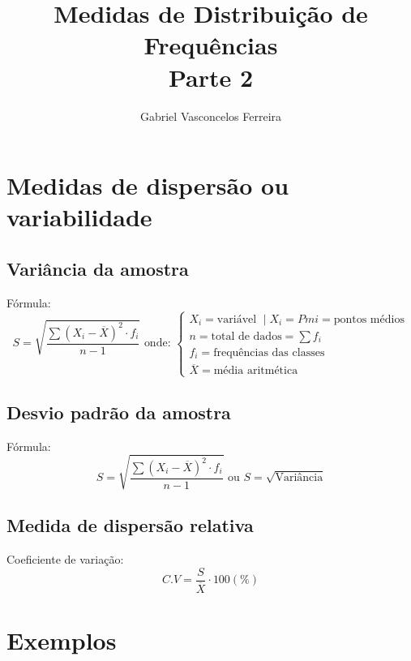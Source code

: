 \documentclass{jhwhw}
\begin{document}
\author{Gabriel Vasconcelos Ferreira}
\title{%
	\large Medidas de Distribuição de Frequências \\
	Parte 2 \\
}
\maketitle
\chapter{Medidas de dispersão ou variabilidade}
\section{Variância da amostra}
Fórmula:
\[
	\boxed{S = \sqrt{\frac{\sum{(X_i-\overline{X})^2\cdot f_i}}{n-1}}} \text{ onde: } \begin{cases}
		X_i = \text{variável } \mid X_i = Pmi = \text{pontos médios} \\
		n = \text{total de dados} = \sum{f_i}                        \\
		f_i = \text{frequências das classes}                         \\
		\overline{X} = \text{média aritmética}
	\end{cases}
\]
\section{Desvio padrão da amostra}
Fórmula:
\[
	\boxed{S = \sqrt{\frac{\sum{(X_i-\overline{X})^2\cdot f_i}}{n-1}}} \text{ ou } \boxed{S = \sqrt{\text{Variância}}}
\]
\section{Medida de dispersão relativa}
Coeficiente de variação:
\[
	C.V = \frac{S}{\overline{X}} \cdot 100 (\%)
\]
\chapter{Exemplos}
\end{document}
